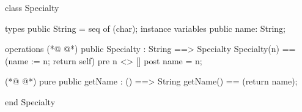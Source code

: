 \begin{vdmpp}[breaklines=true]
class Specialty

types
 public String = seq of (char);
instance variables
  public name: String;
  
operations
(*@
\label{Specialty:9}
@*)
 public Specialty : String ==> Specialty
  Specialty(n) == (name := n; return self)
 pre n <> []
 post name = n;
  
(*@
\label{getName:14}
@*)
 pure public getName : () ==> String
  getName() == (return name);

end Specialty
\end{vdmpp}
